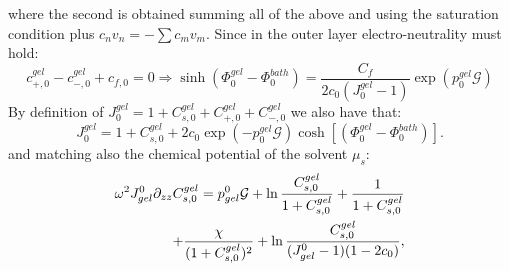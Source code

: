 \documentclass[12pt]{extarticle}
\begin{document}
where the second is obtained summing all of the above and using the saturation condition plus $c_nv_n=-\sum c_mv_m$. 
Since in the outer layer electro-neutrality must hold:
\begin{equation}
c^{gel}_{+,0}-c^{gel}_{-,0}+c_{f,0} =0 \Rightarrow  \sinh(\Phi_0^{gel}-\Phi_0^{bath})= \frac{C_f}{2c_0 (J_0^{gel}-1)}\exp(p_0^{gel}\mathcal{G})\label{eq2}
\end{equation}
By definition of $J^{gel}_0=1+C^{gel}_{s,0}+C^{gel}_{+,0}+C^{gel}_{-,0}$ we also have that:
\begin{equation}
J^{gel}_0=1+C^{gel}_{s,0}+ 2c_0\exp(-p_0^{gel}\mathcal{G})\cosh[(\Phi^{gel}_0-\Phi_0^{bath})]\label{eq3}.
\end{equation}
and matching also the chemical potential of the solvent $\mu_s$:
\begin{equation}
\begin{aligned}
\omega^2 J^0_{gel} \partial_{zz} C^{gel}_{s,0}= p^0_{gel} \mathcal{G}  + \ln \frac{C^{gel}_{s,0}}{1+C^{gel}_{s,0}} + \frac{1}{1+C^{gel}_{s,0}}\\+\frac{\chi}{(1+C^{gel}_{s,0})^2} + \ln \frac{C^{gel}_{s,0}}{(J^0_{gel}-1)(1-2c_0)}, 
\end{aligned}\\[2.5mm]\label{eq4}
\end{equation}
\end{document}
